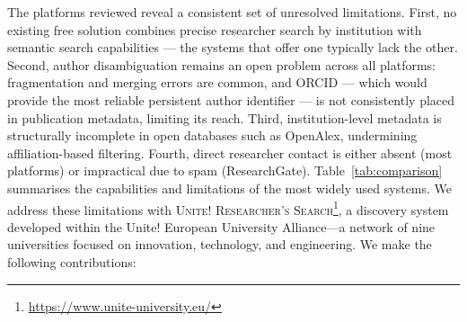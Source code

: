 \documentclass[sigconf, nonacm]{acmart}
\begin{document}
\begin{table}[h]
\centering
\caption{Comparison of researcher discovery platforms. Capabilities marked as: \checkmark\ full, $\sim$ partial, \texttimes\ absent.}
\label{tab:comparison}
\end{table}

The platforms reviewed reveal a consistent set of unresolved limitations.
First, no existing free solution combines precise researcher search by institution with semantic search capabilities — the systems that offer one typically lack the other.
Second, author disambiguation remains an open problem across all platforms: fragmentation and merging errors are common, and ORCID — which would provide the most reliable persistent author identifier — is not consistently placed in publication metadata, limiting its reach.
Third, institution-level metadata is structurally incomplete in open databases such as OpenAlex, undermining affiliation-based filtering.
Fourth, direct researcher contact is either absent (most platforms) or impractical due to spam (ResearchGate).
Table~\ref{tab:comparison} summarises the capabilities and limitations of the most widely used systems.
We address these limitations with \textsc{Unite! Researcher's Search}\footnote{\url{https://www.unite-university.eu/}}, a discovery system developed within the Unite! European University Alliance---a network of nine universities focused on innovation, technology, and engineering. We make the following contributions:
\end{document}
